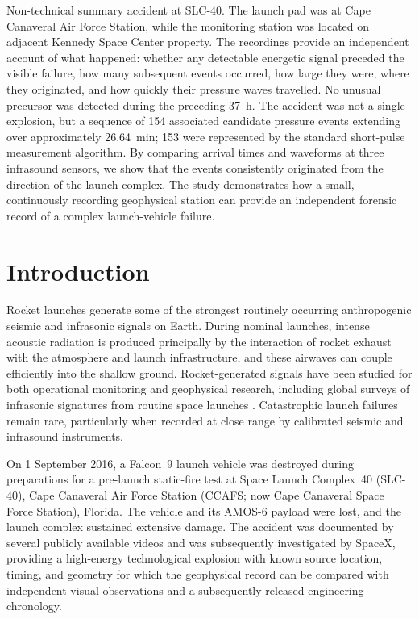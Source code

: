 \documentclass[]{seismica}
\begin{document}
{\begin{summary}{Non-technical summary}
  accident at SLC-40. The launch pad was at Cape Canaveral Air Force Station,
  while the monitoring station was located on adjacent Kennedy Space Center
  property. The recordings provide an independent account of what happened:
  whether any detectable energetic signal preceded the visible failure, how
  many subsequent events occurred, how large they were, where they originated,
  and how quickly their pressure waves travelled. No unusual precursor was
  detected during the preceding \SI{37}{\hour}. The accident was not a single explosion, but a sequence of 154 associated
  candidate pressure events extending over approximately
  \SI{26.64}{\minute}; 153 were represented by the standard short-pulse
  measurement algorithm. By comparing arrival times and waveforms at
  three infrasound sensors, we show that the events consistently originated
  from the direction of the launch complex. The study demonstrates how a
  small, continuously recording geophysical station can provide an independent
  forensic record of a complex launch-vehicle failure.
  \end{summary}
}


\section{Introduction}
\label{sec:introduction}

Rocket launches generate some of the strongest routinely occurring
anthropogenic seismic and infrasonic signals on Earth. During nominal launches,
intense acoustic radiation is produced principally by the interaction of rocket
exhaust with the atmosphere and launch infrastructure, and these airwaves can
couple efficiently into the shallow ground. Rocket-generated signals have been
studied for both operational monitoring and geophysical research, including
global surveys of infrasonic signatures from routine space launches
\citep{pilger_rocket_2021}. Catastrophic launch failures remain rare,
particularly when recorded at close range by calibrated seismic and infrasound
instruments.

On 1 September 2016, a Falcon~9 launch vehicle was destroyed during
preparations for a pre-launch static-fire test at Space Launch Complex~40
(SLC-40), Cape Canaveral Air Force Station (CCAFS; now Cape Canaveral Space
Force Station), Florida. The vehicle and its AMOS-6 payload were lost, and the
launch complex sustained extensive damage. The accident was documented by
several publicly available videos and was subsequently investigated by SpaceX,
providing a high-energy technological explosion with known source location,
timing, and geometry for which the geophysical record can be compared with
independent visual observations and a subsequently released engineering
chronology.
\end{document}
